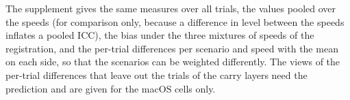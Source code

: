 The supplement gives the same measures over all trials, the values pooled over the speeds (for comparison only, because
a difference in level between the speeds inflates a pooled ICC), the bias under the three mixtures of speeds of the
registration, and the per-trial differences per scenario and speed with the mean on each side, so that the scenarios
can be weighted differently. The views of the per-trial differences that leave out the trials of the carry layers need
the prediction and are given for the macOS cells only.



